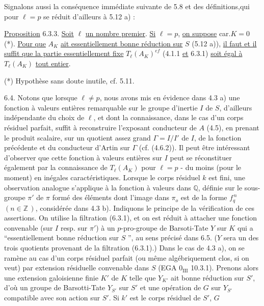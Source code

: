 Signalons aussi la conséquence immédiate suivante de 5.8 et des définitions,qui pour $\ell = p$ se réduit d'ailleurs à 5.12 a) :

\underline{Proposition} 6.3.3. \underline{Soit} $\ell$ \underline{un nombre premier}. \underline{Si} $\ell = p$, \underline{on suppose} car.$K = 0$ (*). \underline{Pour que} $A_K$ \underline{ait essentiellement bonne réduction sur} $S$ (5.12 a)), \underline{il faut et il suffit que la partie essentiellement fixe} $T_\ell(A_K)^{ef}$ (4.1.1 \underline{et} 6.3.1) \underline{soit égal à} $T_\ell(A_K)$ \underline{tout entier}.

(*) Hypothèse sans doute inutile, cf. 5.11.



6.4. Notons que lorsque $\ell \neq p$, nous avons mis en évidence dans 4.3 a) une fonction à valeurs entières remarquable sur le groupe d'inertie $I$ de $S$, d'ailleurs indépendante du choix de $\ell$, et dont la connaissance, dans le cas d'un corps résiduel parfait, suffit à reconstruire l'exposant conducteur de $A$ (4.5), en prenant le produit scalaire, sur un quotient assez grand $\Gamma = I/I'$ de $I$, de la fonction précédente et du conducteur d'Artin sur $\Gamma$ (cf. (4.6.2)). Il peut être intéressant d'observer que cette fonction à valeurs entières sur $I$ peut se réconstituer également par la connaissance de $T_\ell(A_K)$ pour $\ell = p$ - du moins (pour le moment) en inégales caractéristiques. Lorsque le corps résiduel $k$ est fini, une observation analogue s'applique à la fonction à valeurs dans $\mathbb{Q}$, définie sur le sous-groupe $\pi'$ de $\pi$ formé des éléments dont l'image dans $\pi_o$ est de la forme $f_q^{\,n}$ $(n \in \mathbb{Z}\,)$, considérée dans 4.3 b). Indiquons le principe de la vérification de ces assertions. On utilise la filtration (6.3.1), et on est réduit à attacher une fonction convenable (sur $I$ resp. sur $\pi'$) à un $p$-pro-groupe de Barsoti-Tate $Y$ sur $K$ qui a ``essentiellement bonne réduction sur $S$ '', au sens précisé dans 6.5. ($Y$ sera un des trois quotients provenant de la filtration (6.3.1).) Dans le cas de 4.3 a), on se ramène au cas d'un corps résiduel parfait (ou même algébriquement clos, si on veut) par extension résiduelle convenable dans $S$ (EGA $0_{\mathrm{III}}$ 10.3.1). Prenons alors une extension galoisienne finie $K'$ de $K$ telle que $Y_{K'}$ ait bonne réduction sur $S'$, d'où un groupe de Barsotti-Tate $Y_{S'}$ sur $S'$ et une opération de $G$ sur $Y_{S'}$ compatible avec son action sur $S'$. Si $k'$ est le corps résiduel de $S'$, $G$



